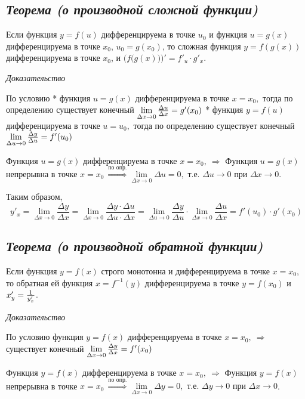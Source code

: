 \subsection{\textit{Теорема (о производной сложной функции)}}

Если функция $y=f(u)$ дифференцируема в точке $u_0$ и функция $u = g(x)$ дифференцируема в точке $x_0$, $u_0 = g(x_0)$, то сложная функция $y = f(g(x))$ дифференцируема в точке $x_0$, и $\Big(f\big(g(x)\big)\Big)' = f'_u\cdot g'_x$.

\textit{Доказательство}

По условию * функция $u = g(x)$ дифференцируема в точке $x = x_0,$ тогда по определению существует конечный $\lim\limits_{\Delta x\rightarrow 0}{\Large\frac{\Delta u}{\Delta x}} = g'(x_0)$ * функция $y = f(u)$ дифференцируема в точке $u = u_0,$ тогда по определению существует конечный $\lim\limits_{\Delta u\rightarrow 0}{\Large\frac{\Delta y}{\Delta u}} = f'(u_0)$

Функция $u = g(x)$ дифференцируема в точке $x = x_0, \ \Rightarrow$ Функция $u = g(x)$ непрерывна в точке $x = x_0 \ \overset{\text{по опр.}}{\Rightarrow} \lim\limits_{\Delta x \rightarrow 0}\Delta u = 0, \text{ т.е. } \Delta u \rightarrow 0 \text{ при } \Delta x \rightarrow 0$.

Таким образом, $$y'_x=\lim\limits_{\Delta x \rightarrow 0}\frac{\Delta y}{\Delta x}=\lim\limits_{\Delta x \rightarrow 0}\frac{\Delta y\cdot \Delta u}{\Delta u \cdot \Delta x} = \lim\limits_{\Delta u \rightarrow 0}\frac{\Delta y}{\Delta u}\cdot \lim\limits_{\Delta x \rightarrow 0}\frac{\Delta u}{\Delta x} = f'(u_0)\cdot g'(x_0)$$
\newpage 
\subsection{\textit{Теорема (о производной обратной функции)}}

Если функция $y = f(x)$ строго монотонна и дифференцируема в точке $x = x_0$, то обратная ей функция $x = f^{-1}(y)$ дифференцируема в точке $y = f(x_0)$ и $x'_y = {\Large\frac{1}{y'_x}}$.

\textit{Доказательство}

По условию функция $y = f(x)$ дифференцируема в точке $x = x_0, \ \Rightarrow$ существует конечный $\lim\limits_{\Delta x \rightarrow 0}{\Large\frac{\Delta y}{\Delta x}} = f'(x_0)$

Функция $y = f(x)$ дифференцируема в точке $x = x_0, \ \Rightarrow$ Функция $y = f(x)$ непрерывна в точке $x = x_0 \ \overset{\text{по опр.}}{\Rightarrow} \lim\limits_{\Delta x \rightarrow 0}\Delta y = 0, \text{ т.е. } \Delta y \rightarrow 0 \text{ при } \Delta x \rightarrow 0$.

